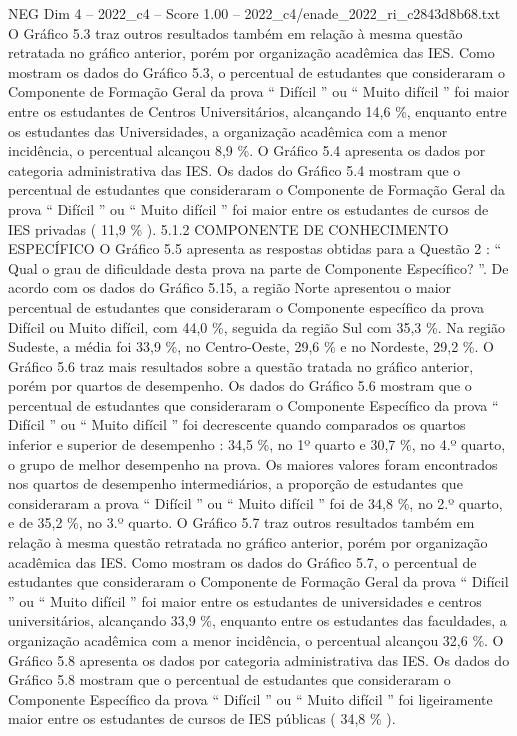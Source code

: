 \begin{textsample}{NEG Dim 4 – 2022\_c4 – Score 1.00 – 2022\_c4/enade\_2022\_ri\_c2843d8b68.txt}
O Gráfico 5.3 traz outros resultados também em relação à mesma questão retratada no gráfico anterior, porém por organização acadêmica das IES.
Como mostram os dados do Gráfico 5.3, o percentual de estudantes que consideraram o Componente de Formação Geral da prova “ Difícil ” ou “ Muito difícil ” foi maior entre os estudantes de Centros Universitários, alcançando 14,6 \%, enquanto entre os estudantes das Universidades, a organização acadêmica com a menor incidência, o percentual alcançou 8,9 \%.
O Gráfico 5.4 apresenta os dados por categoria administrativa das IES.
Os dados do Gráfico 5.4 mostram que o percentual de estudantes que consideraram o Componente de Formação Geral da prova “ Difícil ” ou “ Muito difícil ” foi maior entre os estudantes de cursos de IES privadas ( 11,9 \% ). 5.1.2 COMPONENTE DE CONHECIMENTO ESPECÍFICO O Gráfico 5.5 apresenta as respostas obtidas para a Questão 2 : “ Qual o grau de dificuldade desta prova na parte de Componente Específico? ”.
De acordo com os dados do Gráfico 5.15, a região Norte apresentou o maior percentual de estudantes que consideraram o Componente específico da prova Difícil ou Muito difícil, com 44,0 \%, seguida da região Sul com 35,3 \%.
Na região Sudeste, a média foi 33,9 \%, no Centro-Oeste, 29,6 \% e no Nordeste, 29,2 \%.
O Gráfico 5.6 traz mais resultados sobre a questão tratada no gráfico anterior, porém por quartos de desempenho.
Os dados do Gráfico 5.6 mostram que o percentual de estudantes que consideraram o Componente Específico da prova “ Difícil ” ou “ Muito difícil ” foi decrescente quando comparados os quartos inferior e superior de desempenho : 34,5 \%, no 1º quarto e 30,7 \%, no 4.º quarto, o grupo de melhor desempenho na prova.
Os maiores valores foram encontrados nos quartos de desempenho intermediários, a proporção de estudantes que consideraram a prova “ Difícil ” ou “ Muito difícil ” foi de 34,8 \%, no 2.º quarto, e de 35,2 \%, no 3.º quarto.
O Gráfico 5.7 traz outros resultados também em relação à mesma questão retratada no gráfico anterior, porém por organização acadêmica das IES.
Como mostram os dados do Gráfico 5.7, o percentual de estudantes que consideraram o Componente de Formação Geral da prova “ Difícil ” ou “ Muito difícil ” foi maior entre os estudantes de universidades e centros universitários, alcançando 33,9 \%, enquanto entre os estudantes das faculdades, a organização acadêmica com a menor incidência, o percentual alcançou 32,6 \%.
O Gráfico 5.8 apresenta os dados por categoria administrativa das IES.
Os dados do Gráfico 5.8 mostram que o percentual de estudantes que consideraram o Componente Específico da prova “ Difícil ” ou “ Muito difícil ” foi ligeiramente maior entre os estudantes de cursos de IES públicas ( 34,8 \% ).

\end{textsample}
